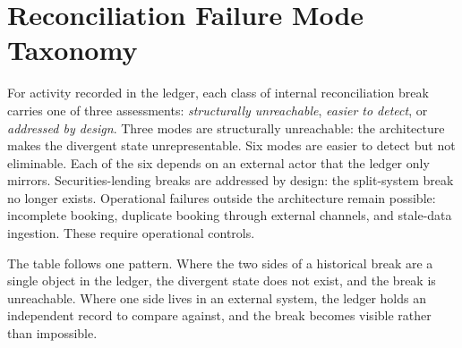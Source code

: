 \section{Reconciliation Failure Mode Taxonomy}
\label{app:reconciliation}

For activity recorded in the ledger, each class of internal reconciliation break carries one of three assessments: \emph{structurally unreachable}, \emph{easier to detect}, or \emph{addressed by design}. Three modes are structurally unreachable: the architecture makes the divergent state unrepresentable. Six modes are easier to detect but not eliminable. Each of the six depends on an external actor that the ledger only mirrors. Securities-lending breaks are addressed by design: the split-system break no longer exists. Operational failures outside the architecture remain possible: incomplete booking, duplicate booking through external channels, and stale-data ingestion. These require operational controls.

The table follows one pattern. Where the two sides of a historical break are a single object in the ledger, the divergent state does not exist, and the break is unreachable. Where one side lives in an external system, the ledger holds an independent record to compare against, and the break becomes visible rather than impossible.

